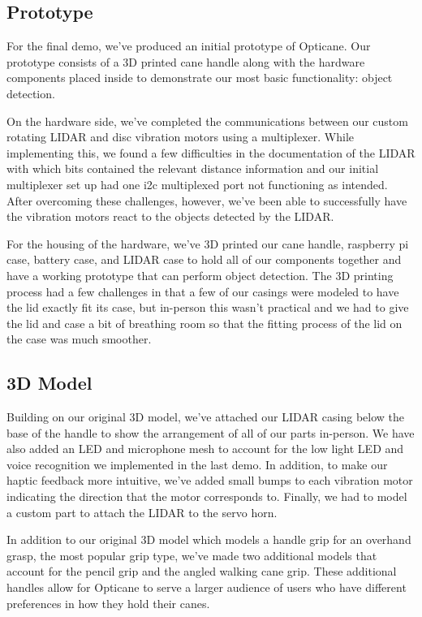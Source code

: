 \documentclass{article}
\begin{document}
\subsection{Prototype}

For the final demo, we've produced an initial prototype of Opticane. Our prototype consists of a 3D printed cane handle along with the hardware components placed inside to demonstrate our most basic functionality: object detection.

On the hardware side, we've completed the communications between our custom rotating LIDAR and disc vibration motors using a multiplexer. While implementing this, we found a few difficulties in the documentation of the LIDAR with which bits contained the relevant distance information and our initial multiplexer set up had one i2c multiplexed port not functioning as intended. After overcoming these challenges, however, we've been able to successfully have the vibration motors react to the objects detected by the LIDAR.

For the housing of the hardware, we've 3D printed our cane handle, raspberry pi case, battery case, and LIDAR case to hold all of our components together and have a working prototype that can perform object detection. The 3D printing process had a few challenges in that a few of our casings were modeled to have the lid exactly fit its case, but in-person this wasn't practical and we had to give the lid and case a bit of breathing room so that the fitting process of the lid on the case was much smoother.

\subsection{3D Model}

Building on our original 3D model, we've attached our LIDAR casing below the base of the handle to show the arrangement of all of our parts in-person. We have also added an LED and microphone mesh to account for the low light LED and voice recognition we implemented in the last demo. In addition, to make our haptic feedback more intuitive, we've added small bumps to each vibration motor indicating the direction that the motor corresponds to. Finally, we had to model a custom part to attach the LIDAR to the servo horn.

In addition to our original 3D model which models a handle grip for an overhand grasp, the most popular grip type, we've made two additional models that account for the pencil grip and the angled walking cane grip. These additional handles allow for Opticane to serve a larger audience of users who have different preferences in how they hold their canes.
\end{document}
